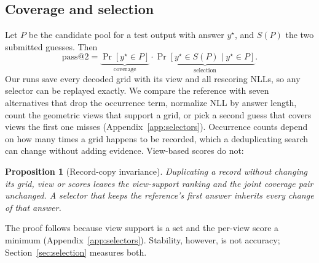 \documentclass[10pt,twocolumn]{article}
\theoremstyle{plain}\newtheorem{proposition}{Proposition}
\theoremstyle{definition}\newtheorem{corollary}{Corollary}
\begin{document}
\subsection{Coverage and selection}\label{sec:decomp}
Let $P$ be the candidate pool for a test output with answer $y^\star$, and $S(P)$ the two submitted guesses. Then
\begin{equation}
\mathrm{pass@2}=\underbrace{\Pr[y^\star\in P]}_{\text{coverage}}\cdot\underbrace{\Pr[y^\star\in S(P)\mid y^\star\in P]}_{\text{selection}} .
\end{equation}
Our runs save every decoded grid with its view and all rescoring NLLs, so any selector can be replayed exactly. We compare the reference with seven alternatives that drop the occurrence term, normalize NLL by answer length, count the geometric views that support a grid, or pick a second guess that covers views the first one misses (Appendix~\ref{app:selectors}). Occurrence counts depend on how many times a grid happens to be recorded, which a deduplicating search can change without adding evidence. View-based scores do not:
\begin{proposition}[Record-copy invariance]\label{prop:copy}
Duplicating a record without changing its grid, view or scores leaves the view-support ranking and the joint coverage pair unchanged. A selector that keeps the reference's first answer inherits every change of that answer.
\end{proposition}
The proof follows because view support is a set and the per-view score a minimum (Appendix~\ref{app:selectors}). Stability, however, is not accuracy; Section~\ref{sec:selection} measures both.
\end{document}
